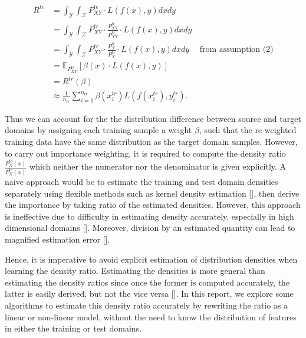 \documentclass[a4paper,12pt]{article}
\begin{document}
\begin{align*} 
    R^{te} &= \int_{\mathcal{Y}}\int_{\mathcal{X}}{P^{te}_{XY} \cdot L(f(x), y)} dxdy \\
    &= \int_{\mathcal{Y}}\int_{\mathcal{X}}{P^{tr}_{XY} \cdot \frac{P^{te}_{XY}}{P^{tr}_{XY}} \cdot L(f(x), y)} dxdy\\
    &=  \int_{\mathcal{Y}}\int_{\mathcal{X}}{P^{tr}_{XY} \cdot \frac{P^{te}_{X}}{P^{tr}_{X}} \cdot L(f(x), y)} dxdy  \hspace{15pt} \text{from assumption (2)} \\
    & = \mathbb{E}_{P^{tr}_{XY}}[\beta(x) \cdot L(f(x), y)] \\
    &= R^{tr}(\beta) \\
    & \approx \frac{1}{n_{tr}} \sum_{i = 1}^{n_{tr}} \beta(x_{i}^{tr}) L(f(x_{i}^{tr}), y_{i}^{tr}) \text{.}
\end{align*}

Thus we can account for the the distribution difference between source and target domains by assigning each training sample a weight $\beta$, such that the re-weighted training data have the same distribution as the target domain samples. However, to carry out importance weighting, it is required to compute the density ratio $ \frac{P^{te}_{X}(x)}{P^{tr}_{X}(x)}$ which neither the numerator nor the denominator is given explicitly. A naive approach would be to estimate the training and test domain densities separately using flexible methods such as kernel density estimation [\cite{sheather1991reliable}], then derive the importance by taking ratio of the estimated densities. However, this approach is ineffective due to difficulty in estimating density accurately, especially in high dimensional domains [\cite{fishman2013monte}]. Moreover, division by an estimated quantity can lead to magnified estimation error [\cite{sugiyama2010dimensionality}]. 

Hence, it is imperative to avoid explicit estimation of distribution densities when learning the density ratio. Estimating the densities is more general than estimating the density ratios since once the former is computed accurately, the latter is easily derived, but not the vice versa [\cite{sugiyama2010dimensionality}]. In this report, we explore some algorithms to estimate this density ratio accurately by rewriting the ratio as a linear or non-linear model, without the need to know the distribution of features in either the training or test domains.
\end{document}
